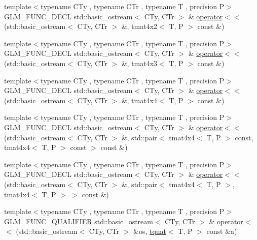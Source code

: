 \begin{DoxyCompactItemize}
{\footnotesize template$<$typename C\+Ty , typename C\+Tr , typename T , precision P$>$ }\\G\+L\+M\+\_\+\+F\+U\+N\+C\+\_\+\+D\+E\+C\+L std\+::basic\+\_\+ostream$<$ C\+Ty, C\+Tr $>$ \& \hyperlink{group__gtx__io_ga8ce3cf61260e62080a9596c2f10ab4a0}{operator$<$$<$} (std\+::basic\+\_\+ostream$<$ C\+Ty, C\+Tr $>$ \&, tmat4x2$<$ T, P $>$ const \&)
\item 
{\footnotesize template$<$typename C\+Ty , typename C\+Tr , typename T , precision P$>$ }\\G\+L\+M\+\_\+\+F\+U\+N\+C\+\_\+\+D\+E\+C\+L std\+::basic\+\_\+ostream$<$ C\+Ty, C\+Tr $>$ \& \hyperlink{group__gtx__io_gaca75b14a0534a02860349a114a10aa44}{operator$<$$<$} (std\+::basic\+\_\+ostream$<$ C\+Ty, C\+Tr $>$ \&, tmat4x3$<$ T, P $>$ const \&)
\item 
{\footnotesize template$<$typename C\+Ty , typename C\+Tr , typename T , precision P$>$ }\\G\+L\+M\+\_\+\+F\+U\+N\+C\+\_\+\+D\+E\+C\+L std\+::basic\+\_\+ostream$<$ C\+Ty, C\+Tr $>$ \& \hyperlink{group__gtx__io_ga6683acc91ba7ce5822e25a2517550bff}{operator$<$$<$} (std\+::basic\+\_\+ostream$<$ C\+Ty, C\+Tr $>$ \&, tmat4x4$<$ T, P $>$ const \&)
\item 
{\footnotesize template$<$typename C\+Ty , typename C\+Tr , typename T , precision P$>$ }\\G\+L\+M\+\_\+\+F\+U\+N\+C\+\_\+\+D\+E\+C\+L std\+::basic\+\_\+ostream$<$ C\+Ty, C\+Tr $>$ \& \hyperlink{group__gtx__io_ga112ff562e10c18929151d17e711e27a7}{operator$<$$<$} (std\+::basic\+\_\+ostream$<$ C\+Ty, C\+Tr $>$ \&, std\+::pair$<$ tmat4x4$<$ T, P $>$ const, tmat4x4$<$ T, P $>$ const  $>$ const \&)
\item 
{\footnotesize template$<$typename C\+Ty , typename C\+Tr , typename T , precision P$>$ }\\G\+L\+M\+\_\+\+F\+U\+N\+C\+\_\+\+D\+E\+C\+L std\+::basic\+\_\+ostream$<$ C\+Ty, C\+Tr $>$ \& \hyperlink{group__gtx__io_gad09c7114641975d778243bd4379a3ea5}{operator$<$$<$} (std\+::basic\+\_\+ostream$<$ C\+Ty, C\+Tr $>$ \&, std\+::pair$<$ tmat4x4$<$ T, P $>$, tmat4x4$<$ T, P $>$ $>$ const \&)
\item 
{\footnotesize template$<$typename C\+Ty , typename C\+Tr , typename T , precision P$>$ }\\G\+L\+M\+\_\+\+F\+U\+N\+C\+\_\+\+Q\+U\+A\+L\+I\+F\+I\+E\+R std\+::basic\+\_\+ostream$<$ C\+Ty, C\+Tr $>$ \& \hyperlink{group__gtx__io_ga038d37e8d7965dc7bfae5dc23e4140af}{operator$<$$<$} (std\+::basic\+\_\+ostream$<$ C\+Ty, C\+Tr $>$ \&os, \hyperlink{structglm_1_1tquat}{tquat}$<$ T, P $>$ const \&a)

\end{DoxyCompactItemize}
